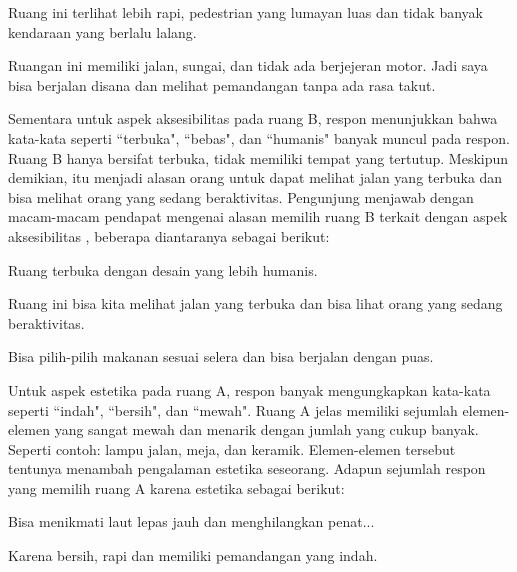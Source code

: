 \documentclass[11pt]{udthesis} %
\begin{document}
\begin{quoting}
    Ruang ini terlihat lebih rapi, pedestrian yang lumayan luas dan tidak banyak kendaraan yang berlalu lalang.
\end{quoting}

\begin{quoting}
    Ruangan ini memiliki jalan, sungai, dan tidak ada berjejeran motor. Jadi saya bisa berjalan disana dan melihat pemandangan tanpa ada rasa takut.
\end{quoting}

Sementara untuk aspek aksesibilitas pada ruang B, respon menunjukkan bahwa kata-kata seperti ``terbuka", ``bebas", dan ``humanis" banyak muncul pada respon. Ruang B hanya bersifat terbuka, tidak memiliki tempat yang tertutup. Meskipun demikian, itu menjadi alasan orang untuk dapat melihat jalan yang terbuka dan bisa melihat orang yang sedang beraktivitas. Pengunjung menjawab dengan macam-macam pendapat mengenai alasan memilih ruang B terkait dengan aspek aksesibilitas , beberapa diantaranya sebagai berikut:

\begin{quoting}
    Ruang terbuka dengan desain yang lebih humanis.
\end{quoting}

\begin{quoting}
    Ruang ini bisa kita melihat jalan yang terbuka dan bisa lihat orang yang sedang beraktivitas.
\end{quoting}

\begin{quoting}
    Bisa pilih-pilih makanan sesuai selera dan bisa berjalan dengan puas.
\end{quoting}

Untuk aspek estetika pada ruang A, respon banyak mengungkapkan kata-kata seperti ``indah", ``bersih", dan ``mewah". Ruang A jelas memiliki sejumlah elemen-elemen yang sangat mewah dan menarik dengan jumlah yang cukup banyak. Seperti contoh: lampu jalan, meja, dan keramik. Elemen-elemen tersebut tentunya menambah pengalaman estetika seseorang. Adapun sejumlah respon yang memilih ruang A karena estetika sebagai berikut:

\begin{quoting}
   Bisa menikmati laut lepas jauh dan menghilangkan penat...
\end{quoting}

\begin{quoting}
    Karena bersih, rapi dan memiliki pemandangan yang indah.
\end{quoting}
\end{document}
